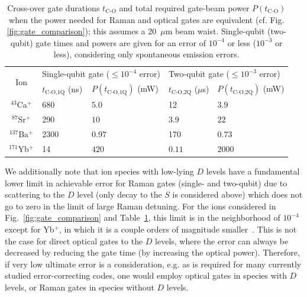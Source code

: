 \documentclass[%
reprint,
 amsmath,amssymb,
]{revtex4-1}
\begin{document}
\begin{table}[t b h !]
\caption{Cross-over gate durations $t_{\textrm{C-O}}$ and total required gate-beam power $P(t_{\textrm{C-O}})$ when the power needed for Raman and optical gates are equivalent (cf. Fig.\ref{fig:gate_comparison}); this assumes a 20~$\mu$m beam waist.  Single-qubit (two-qubit) gate times and powers are given for an error of $10^{-4}$ or less ($10^{-3}$ or less), considering only spontaneous emission errors.}
\begin{ruledtabular}
\begin{tabular}{cllll}

\multirow{2}{*}{Ion } & \multicolumn{2}{l}{Single-qubit gate ($\leq 10^{-4}$ error)} & \multicolumn{2}{l}{Two-qubit gate ($\leq 10^{-3}$ error)} \\
                     &   $t_{\textrm{C-O,1Q}}$ (ns)  &  $P(t_{\textrm{C-O,1Q}})$ (mW) &   $t_{\textrm{C-O,2Q}}$ ($\mu$s)  &  $P(t_{\textrm{C-O,2Q}})$ (mW) \\
\hline
\rule{0pt}{4ex} $^{43}$Ca$^{+}$  &  680 & $5.0$    &  12        &  $3.9$  \\
$^{87}$Sr$^{+}$  &  290                 &  $10$    &  3.9       &  $22$  \\
$^{137}$Ba$^{+}$ &  2300                &  $0.97$  &  170       &  $0.73$  \\
$^{171}$Yb$^{+}$ &  14                  &  $420$   &  $0.11$    &  $2000$  \\

\end{tabular}
\end{ruledtabular}

\label{tab:raman_optical}
\end{table}

We additionally note that ion species with low-lying $D$ levels have a fundamental lower limit in achievable error for Raman gates (single- and two-qubit) due to scattering to the $D$ level (only decay to the $S$ is considered above) which does not go to zero in the limit of large Raman detuning.  For the ions considered in Fig.~\ref{fig:gate_comparison} and Table~\ref{tab:raman_optical}, this limit is in the neighborhood of $10^{-4}$ except for Yb$^{+}$, in which it is a couple orders of magnitude smaller~\cite{PhysRevA.75.042329_2007}. This is not the case for direct optical gates to the $D$ levels, where the error can always be decreased by reducing the gate time (by increasing the optical power).  Therefore, if very low ultimate error is a consideration, e.g. as is required for many currently studied error-correcting codes, one would employ optical gates in species with $D$ levels, or Raman gates in species without $D$ levels.
\end{document}
